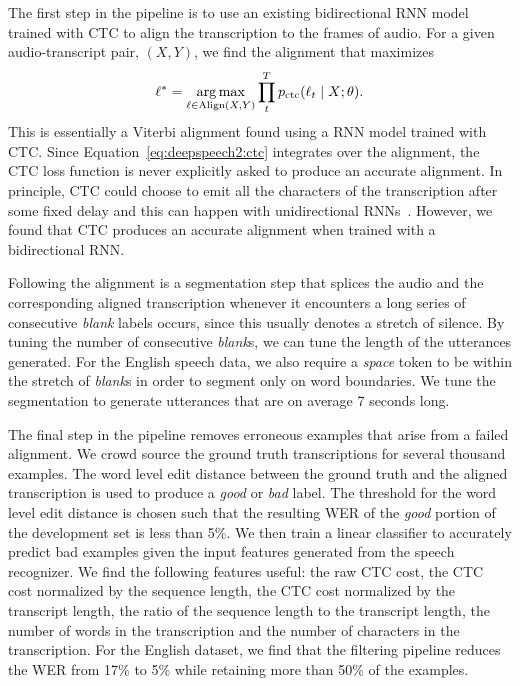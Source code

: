 The first step in the pipeline is to use an existing bidirectional RNN model
trained with CTC to align the transcription to the frames of audio. For a given
audio-transcript pair, $(X, Y)$, we find the alignment that maximizes
\begin{equation*}
\ell^* = \operatorname*{arg\,max}_{\ell \in \text{Align}(X,Y)} \prod_t^T p_{\text{ctc}}(\ell_t \mid X; \theta).
\end{equation*}
This is essentially a Viterbi alignment found using a RNN model trained with
CTC. Since Equation~\ref{eq:deepspeech2:ctc} integrates over the alignment, the
CTC loss function is never explicitly asked to produce an accurate alignment.
In principle, CTC could choose to emit all the characters of the transcription
after some fixed delay and this can happen with unidirectional
RNNs~\cite{sak2015}. However, we found that CTC produces an accurate alignment
when trained with a bidirectional RNN.

Following the alignment is a segmentation step that splices the audio and the
corresponding aligned transcription whenever it encounters a long series of
consecutive \emph{blank} labels occurs, since this usually denotes a stretch of
silence. By tuning the number of consecutive \emph{blank}s, we can tune the
length of the utterances generated. For the English speech data, we also
require a \emph{space} token to be within the stretch of \emph{blank}s in order
to segment only on word boundaries. We tune the segmentation to generate
utterances that are on average 7 seconds long.

The final step in the pipeline removes erroneous examples that arise from a
failed alignment. We crowd source the ground truth transcriptions for several
thousand examples. The word level edit distance between the ground truth and
the aligned transcription is used to produce a \emph{good} or \emph{bad} label.
The threshold for the word level edit distance is chosen such that the
resulting WER of the \emph{good} portion of the development set is less than
5\%. We then train a linear classifier to accurately predict bad examples given
the input features generated from the speech recognizer. We find the following
features useful: the raw CTC cost, the CTC cost normalized by the sequence
length, the CTC cost normalized by the transcript length, the ratio of the
sequence length to the transcript length, the number of words in the
transcription and the number of characters in the transcription. For the
English dataset, we find that the filtering pipeline reduces the WER from 17\%
to 5\% while retaining more than 50\% of the examples.

